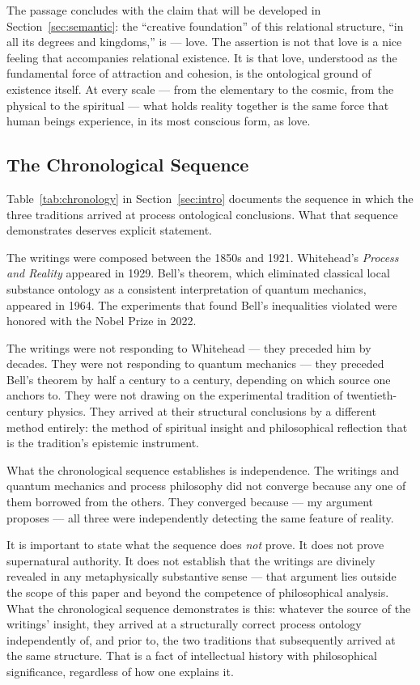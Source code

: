 The passage concludes with the claim that will be developed in
Section~\ref{sec:semantic}: the ``creative foundation'' of this relational
structure, ``in all its degrees and kingdoms,'' is \mahabbat --- love.
The assertion is not that love is a nice feeling that accompanies
relational existence.
It is that love, understood as the fundamental force of attraction and
cohesion, is the ontological ground of existence itself.
At every scale --- from the elementary to the cosmic, from the physical
to the spiritual --- what holds reality together is the same force
that human beings experience, in its most conscious form, as love.

\subsection{The Chronological Sequence}

Table~\ref{tab:chronology} in Section~\ref{sec:intro} documents the
sequence in which the three traditions arrived at process ontological
conclusions.
What that sequence demonstrates deserves explicit statement.

The \bahai writings were composed between the 1850s and 1921.
Whitehead's \textit{Process and Reality} appeared in 1929.
Bell's theorem, which eliminated classical local substance ontology as
a consistent interpretation of quantum mechanics, appeared in 1964.
The experiments that found Bell's inequalities violated were honored with
the Nobel Prize in 2022.

The writings were not responding to Whitehead --- they preceded him
by decades.
They were not responding to quantum mechanics --- they preceded Bell's
theorem by half a century to a century, depending on which \bahai
source one anchors to.
They were not drawing on the experimental tradition of twentieth-century
physics.
They arrived at their structural conclusions by a different method entirely:
the method of spiritual insight and philosophical reflection that is the
\bahai tradition's epistemic instrument.

What the chronological sequence establishes is independence.
The \bahai writings and quantum mechanics and process philosophy did not
converge because any one of them borrowed from the others.
They converged because --- my argument proposes --- all
three were independently detecting the same feature of reality.

It is important to state what the sequence does \emph{not} prove.
It does not prove supernatural authority.
It does not establish that the \bahai writings are divinely revealed
in any metaphysically substantive sense --- that argument lies outside
the scope of this paper and beyond the competence of philosophical analysis.
What the chronological sequence demonstrates is this: whatever the
source of the \bahai writings' insight, they arrived at a structurally
correct process ontology independently of, and prior to, the two
traditions that subsequently arrived at the same structure.
That is a fact of intellectual history with philosophical significance,
regardless of how one explains it.

